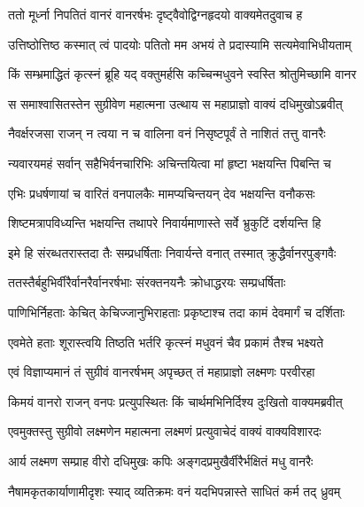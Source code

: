 
\twolineshloka
{ततो मूर्ध्ना निपतितं वानरं वानरर्षभः}
{दृष्ट्वैवोद्विग्नहृदयो वाक्यमेतदुवाच ह} %

\twolineshloka
{उत्तिष्ठोत्तिष्ठ कस्मात् त्वं पादयोः पतितो मम}
{अभयं ते प्रदास्यामि सत्यमेवाभिधीयताम्} %

\twolineshloka
{किं सम्भ्रमाद्धितं कृत्स्नं ब्रूहि यद् वक्तुमर्हसि}
{कच्चिन्मधुवने स्वस्ति श्रोतुमिच्छामि वानर} %

\twolineshloka
{स समाश्वासितस्तेन सुग्रीवेण महात्मना}
{उत्थाय स महाप्राज्ञो वाक्यं दधिमुखोऽब्रवीत्} %

\twolineshloka
{नैवर्क्षरजसा राजन् न त्वया न च वालिना}
{वनं निसृष्टपूर्वं ते नाशितं तत्तु वानरैः} %

\twolineshloka
{न्यवारयमहं सर्वान् सहैभिर्वनचारिभिः}
{अचिन्तयित्वा मां हृष्टा भक्षयन्ति पिबन्ति च} %

\twolineshloka
{एभिः प्रधर्षणायां च वारितं वनपालकैः}
{मामप्यचिन्तयन् देव भक्षयन्ति वनौकसः} %

\twolineshloka
{शिष्टमत्रापविध्यन्ति भक्षयन्ति तथापरे}
{निवार्यमाणास्ते सर्वे भ्रुकुटिं दर्शयन्ति हि} %

\twolineshloka
{इमे हि संरब्धतरास्तदा तैः सम्प्रधर्षिताः}
{निवार्यन्ते वनात् तस्मात् क्रुद्धैर्वानरपुङ्गवैः} %

\twolineshloka
{ततस्तैर्बहुभिर्वीरैर्वानरैर्वानरर्षभाः}
{संरक्तनयनैः क्रोधाद्धरयः सम्प्रधर्षिताः} %

\twolineshloka
{पाणिभिर्निहताः केचित् केचिज्जानुभिराहताः}
{प्रकृष्टाश्च तदा कामं देवमार्गं च दर्शिताः} %

\twolineshloka
{एवमेते हताः शूरास्त्वयि तिष्ठति भर्तरि}
{कृत्स्नं मधुवनं चैव प्रकामं तैश्च भक्ष्यते} %

\twolineshloka
{एवं विज्ञाप्यमानं तं सुग्रीवं वानरर्षभम्}
{अपृच्छत् तं महाप्राज्ञो लक्ष्मणः परवीरहा} %

\twolineshloka
{किमयं वानरो राजन् वनपः प्रत्युपस्थितः}
{किं चार्थमभिनिर्दिश्य दुःखितो वाक्यमब्रवीत्} %

\twolineshloka
{एवमुक्तस्तु सुग्रीवो लक्ष्मणेन महात्मना}
{लक्ष्मणं प्रत्युवाचेदं वाक्यं वाक्यविशारदः} %

\twolineshloka
{आर्य लक्ष्मण सम्प्राह वीरो दधिमुखः कपिः}
{अङ्गदप्रमुखैर्वीरैर्भक्षितं मधु वानरैः} %

\twolineshloka
{नैषामकृतकार्याणामीदृशः स्याद् व्यतिक्रमः}
{वनं यदभिपन्नास्ते साधितं कर्म तद् ध्रुवम्} %


